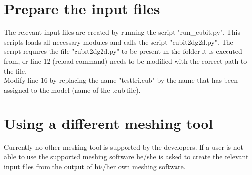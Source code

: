    \section{Prepare the input files}
    \label{sec:prepinput}
    	The relevant input files are created by running the script "run\_cubit.py". This scripts loads all necessary modules and calls the script "cubit2dg2d.py". The script requires the file "cubit2dg2d.py" to be present in the folder it is executed from, or line 12 (reload command) needs to be modified with the correct path to the file. 
    	 \\
    	Modify line 16 by replacing the name "testtri.cub" by the name that has been assigned to the model (name of the .cub file). 
    \section{Using a different meshing tool}
	\label{sec:diffmesh}
		Currently no other meshing tool is supported by the developers. If a user is not able to use the supported meshing software he/she is asked to create the relevant input files from the output of his/her own meshing software.     	  
    	